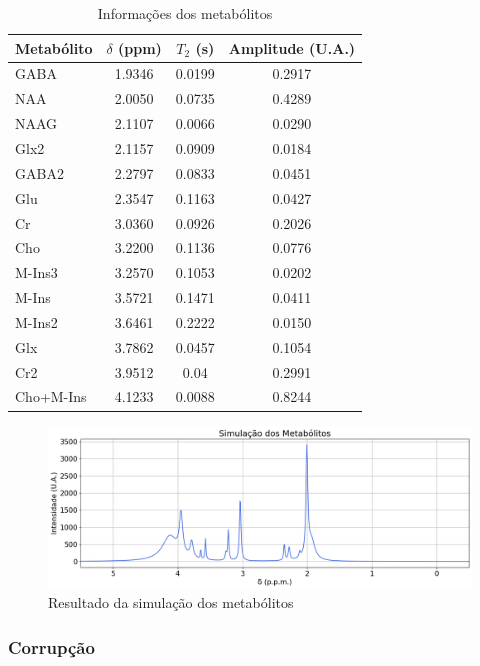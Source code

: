 \documentclass{article}
\begin{document}
\begin{table}[H] 
    \centering
    \begin{tabular}{|l|c|c|c|}
    \hline
    Metabólito & $\delta$ (ppm) & $T_2$ (s) & Amplitude (U.A.) \\
    \hline
    GABA & 1.9346 & 0.0199 & 0.2917 \\
    NAA & 2.0050 & 0.0735 & 0.4289 \\
    NAAG & 2.1107 & 0.0066 & 0.0290 \\
    Glx2 & 2.1157 & 0.0909 & 0.0184 \\
    GABA2 & 2.2797 & 0.0833 & 0.0451 \\
    Glu & 2.3547 & 0.1163 & 0.0427 \\
    Cr & 3.0360 & 0.0926 & 0.2026 \\
    Cho & 3.2200 & 0.1136 & 0.0776 \\
    M-Ins3 & 3.2570 & 0.1053 & 0.0202 \\
    M-Ins & 3.5721 & 0.1471 & 0.0411 \\
    M-Ins2 & 3.6461 & 0.2222 & 0.0150 \\
    Glx & 3.7862 & 0.0457 & 0.1054 \\
    Cr2 & 3.9512 & 0.04 & 0.2991 \\
    Cho+M-Ins & 4.1233 & 0.0088 & 0.8244 \\
    \hline
    \end{tabular}
    \caption{Informações dos metabólitos}
    \label{table:1}
\end{table}

\begin{figure} [H]
    \includegraphics[scale=0.37]{metabolites.png}
    \centering
    \caption{Resultado da simulação dos metabólitos}
    \label{fig:4}
\end{figure}

\subsubsection{Corrupção}
\end{document}
